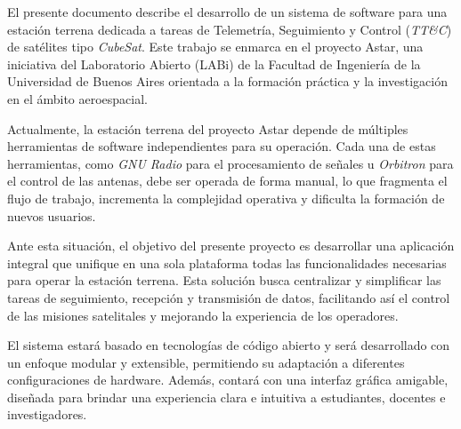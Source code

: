 El presente documento describe el desarrollo de un sistema de software para una estación terrena dedicada a tareas de Telemetría, Seguimiento y Control (\textit{TT\&C}) de satélites tipo \textit{CubeSat}. Este trabajo se enmarca en el proyecto Astar, una iniciativa del Laboratorio Abierto (LABi) de la Facultad de Ingeniería de la Universidad de Buenos Aires orientada a la formación práctica y la investigación en el ámbito aeroespacial.

Actualmente, la estación terrena del proyecto Astar depende de múltiples herramientas de software independientes para su operación. Cada una de estas herramientas, como \textit{GNU Radio} para el procesamiento de señales u \textit{Orbitron} para el control de las antenas, debe ser operada de forma manual, lo que fragmenta el flujo de trabajo, incrementa la complejidad operativa y dificulta la formación de nuevos usuarios.

Ante esta situación, el objetivo del presente proyecto es desarrollar una aplicación integral que unifique en una sola plataforma todas las funcionalidades necesarias para operar la estación terrena. Esta solución busca centralizar y simplificar las tareas de seguimiento, recepción y transmisión de datos, facilitando así el control de las misiones satelitales y mejorando la experiencia de los operadores.

El sistema estará basado en tecnologías de código abierto y será desarrollado con un enfoque modular y extensible, permitiendo su adaptación a diferentes configuraciones de hardware. Además, contará con una interfaz gráfica amigable, diseñada para brindar una experiencia clara e intuitiva a estudiantes, docentes e investigadores.
